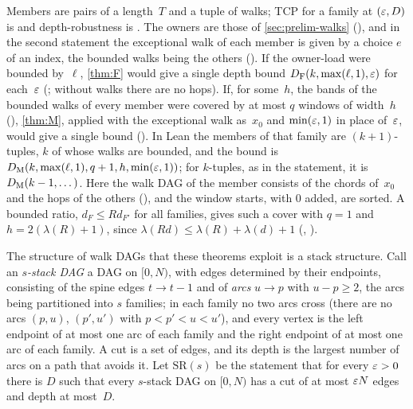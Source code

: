 \begin{outline}
Members are pairs of a length~$T$ and a tuple of walks; TCP for a family at $(\varepsilon,D)$ is  and
depth-robustness is . The owners are those of \cref{sec:prelim-walks} (), and in the second
statement the exceptional walk of each member is given by a choice $e$ of an index, the bounded walks being the others
(). If the owner-load were bounded by~$\ell$, \cref{thm:F} would give a single depth bound
$D_{\mathrm F}(k,\max(\ell,1),\varepsilon)$ for each~$\varepsilon$ (; without walks there are no hops). If, for some~$h$, the bands
of the bounded walks of every member were covered by at most $q$ windows of width~$h$ (), \cref{thm:M},
applied with the exceptional walk as~$x_0$ and $\min(\varepsilon,1)$ in place of~$\varepsilon$, would give a single bound
(). In Lean the members of that family are $(k+1)$-tuples, $k$ of whose walks are bounded, and the bound
is $D_{\mathrm M}(k,\max(\ell,1),q+1,h,\min(\varepsilon,1))$; for $k$-tuples, as in the statement, it is $D_{\mathrm M}(k-1,\dots)$. Here the walk DAG of the member consists of the chords of~$x_0$ and the hops of the others
(), and the window starts, with $0$ added, are sorted. A bounded ratio, $d_F\le Rd_{F'}$ for all
families, gives such a cover with $q=1$ and $h=2(\lambda(R)+1)$, since $\lambda(Rd)\le\lambda(R)+\lambda(d)+1$
(, ).
\end{outline}

The structure of walk DAGs that these theorems exploit is a stack structure. Call an \emph{$s$-stack DAG} a DAG on
$[0,N)$, with edges determined by their endpoints, consisting of the spine edges $t\to t-1$ and of \emph{arcs} $u\to p$ with
$u-p\ge2$, the arcs being partitioned into $s$ families; in each family no two arcs cross (there are no arcs $(p,u)$,
$(p',u')$ with $p<p'<u<u'$), and every vertex is the left endpoint of at most one arc of each family and the right endpoint
of at most one arc of each family. A cut is a set of edges, and its depth is the largest number of arcs on a path that avoids it. Let $\mathrm{SR}(s)$ be
the statement that for every $\varepsilon>0$ there is $D$ such that every $s$-stack DAG on $[0,N)$ has a cut of at most $\varepsilon N$
edges and depth at most~$D$.

